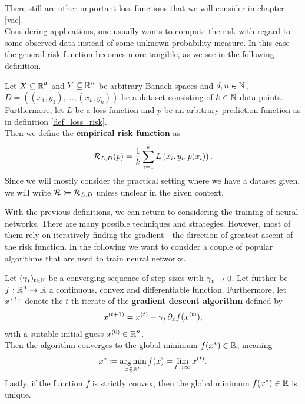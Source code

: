 There still are other important loss functions that we will consider in chapter \ref{vae}.\\
Considering applications, one usually wants to compute the risk with regard to some observed data instead of some unknown probability measure. In this case the general risk function becomes more tangible, as we see in the following definition.


\begin{definition}\label{def_empirical_risk}
Let $X\subseteq \operatorname{\mathbb{R}}^d$ and $Y \subseteq \operatorname{\mathbb{R}}^n$ be arbitrary Banach spaces and $d, n \in \operatorname{\mathbb{N}}$, $D = \left((x_1,y_1), \ldots, (x_k,y_k)\right)$ be a dataset consisting of $k\in\operatorname{\mathbb{N}}$ data points. Furthermore, let $L$ be a loss function and $p$ be an arbitrary prediction function as in definition \ref{def_loss_risk}.\\
Then we define the \textbf{empirical risk function} as
\begin{align}
\operatorname{\mathcal{R}}_{L, D} (p) = \frac{1}{k} \sum_{i=1}^{k} L\left(x_i, y_i, p(x_i)\right).
\end{align}
Since we will mostly consider the practical setting where we have a dataset given, we will write $\operatorname{\mathcal{R}} \coloneqq \operatorname{\mathcal{R}}_{L, D}$ unless unclear in the given context.
\end{definition}


With the previous definitions, we can return to considering the training of neural networks. There are many possible techniques and strategies. However, most of them rely on iteratively finding the gradient - the direction of greatest ascent of the risk function. In the following we want to consider a couple of popular algorithms that are used to train neural networks.


\begin{theorem}\label{theorem_gd}
Let $(\operatorname{\gamma}_t)_{t \in \operatorname{\mathbb{N}}}$ be a converging sequence of step sizes with $\operatorname{\gamma}_t \to 0$. Let further be $f:\operatorname{\mathbb{R}}^n \to \operatorname{\mathbb{R}}$ a continuous, convex and differentiable function. Furthermore, let $x^{(t)}$ denote the $t$-th iterate of the \textbf{gradient descent algorithm} defined by
\begin{align}
x^{(t+1)} = x^{(t)} - \operatorname{\gamma}_t \partial_x f(x^{(t)}),
\end{align}
with a suitable initial guess $x^{(0)}\in \operatorname{\mathbb{R}}^n$.\\
Then the algorithm converges to the global minimum $f(x^{\ast})\in \operatorname{\mathbb{R}}$, meaning
\begin{align*}
x^{\ast} \coloneqq \operatorname*{arg\,min}_{x\in\operatorname{\mathbb{R}}^n}f(x) = \lim_{t\to\infty} x^{(t)}.
\end{align*}
Lastly, if the function $f$ is strictly convex, then the global minimum $f(x^{\ast}) \in\operatorname{\mathbb{R}}$ is unique.
\end{theorem}


